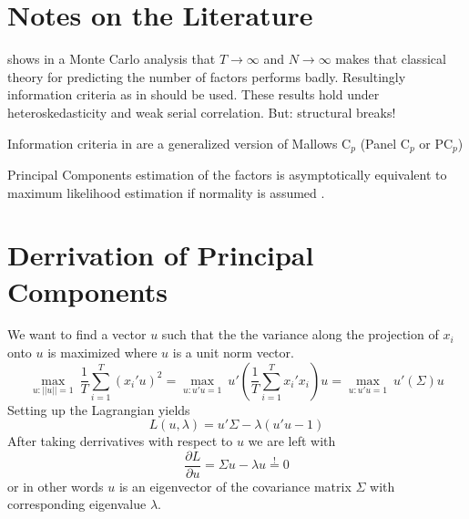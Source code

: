 \documentclass[11pt]{article}
\begin{document}
\section{Notes on the Literature}
\citet{cragg1997inferring} shows in a Monte Carlo analysis that $T\rightarrow\infty$ and $N\rightarrow\infty$ makes that classical theory for predicting the number of factors performs badly. Resultingly information criteria as in \citet{bai2002determining} should be used. These results hold under heteroskedasticity and weak serial correlation. But: structural breaks!

Information criteria in \citet{bai2002determining} are a generalized version of Mallows C$_p$ \citep{mallows1973some} (Panel C$_p$ or PC$_p$)

Principal Components estimation of the factors is asymptotically equivalent to maximum likelihood estimation if normality is assumed \citep{bai2003inferential}.


\appendix
{}

\section{Derrivation of Principal Components}

We want to find a vector $u$ such that the the variance along the projection of $x_i$ onto $u$ is maximized where $u$ is a unit norm vector.
$$\underset{u: ||u|| = 1}{\max} \ \frac{1}{T} \sum_{i=1}^T(x_i'u)^2 = \underset{u: u'u = 1}{\max} \ u' ( \frac{1}{T} \sum_{i=1}^T x_i'x_i )u = \underset{u: u'u = 1}{\max} \ u' (\Sigma)u$$
Setting up the Lagrangian yields
$$ L(u, \lambda) = u' \Sigma - \lambda(u'u-1)$$
After taking derrivatives with respect to $u$ we are left with
$$\frac{\partial L}{\partial u} = \Sigma u -\lambda u \overset{!}{=} 0$$ or in other words $u$ is an eigenvector of the covariance matrix $\Sigma$ with corresponding eigenvalue $\lambda$.




\end{document}
